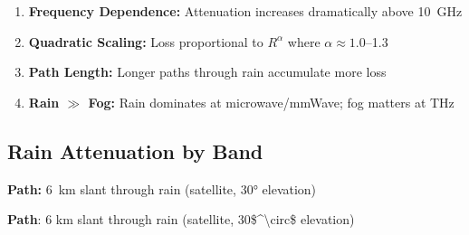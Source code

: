 \begin{enumerate}
\item \textbf{Frequency Dependence:} Attenuation increases dramatically above 10~GHz
\item \textbf{Quadratic Scaling:} Loss proportional to $R^\alpha$ where $\alpha \approx 1.0$--1.3
\item \textbf{Path Length:} Longer paths through rain accumulate more loss
\item \textbf{Rain $\gg$ Fog:} Rain dominates at microwave/mmWave; fog matters at THz
\end{enumerate}

\subsection{Rain Attenuation by Band}

\textbf{Path:} 6~km slant through rain (satellite, $30°$ elevation)

\textbf{Path}: 6 km slant through rain (satellite,
30\$\^{}\textbackslash circ\$ elevation)

